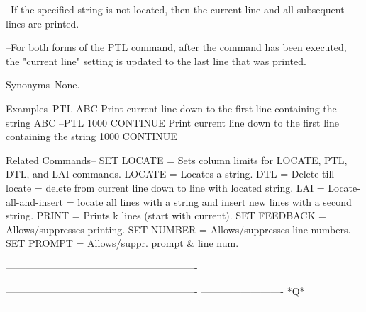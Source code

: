         --If the specified string is not located,
          then the current line and all subsequent
          lines are printed.
 
        --For both forms of the PTL command, after the
          command has been executed, the "current line"
          setting is updated to the last line that was
          printed.
 
Synonyms--None.
 
Examples--PTL ABC              Print current line down
                               to the first line containing
                               the string     ABC
        --PTL 1000 CONTINUE    Print current line down
                               to the first line containing
                               the string     1000 CONTINUE
 
Related Commands--
          SET LOCATE      = Sets column limits for
                            LOCATE, PTL, DTL, and
                            LAI commands.
          LOCATE          = Locates a string.
          DTL             = Delete-till-locate =
                            delete from current line down
                            to line with located string.
          LAI             = Locate-all-and-insert =
                            locate all lines with a string
                            and insert new lines with a second
                            string.
          PRINT           = Prints k lines (start with current).
          SET FEEDBACK    = Allows/suppresses printing.
          SET NUMBER      = Allows/suppresses line numbers.
          SET PROMPT      = Allows/suppr. prompt & line num.
 
----------------------------------------------------------
 
 
 
 
 
 
 
 
 
 
 
----------------------------------------------------------
-------------------------  *Q*  --------------------------
----------------------------------------------------------
 
 
 
 
 
 
 
 
 
 
 
 
 
 
 
 
 
 
 
